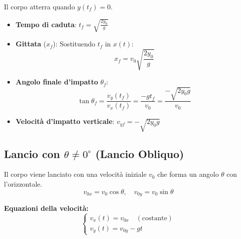 Il corpo atterra quando $y(t_f) = 0$.
\begin{itemize}
    \item \textbf{Tempo di caduta}: $t_f = \sqrt{\frac{2y_0}{g}}$
    \item \textbf{Gittata} ($x_f$): Sostituendo $t_f$ in $x(t)$:
    \begin{equation}
    x_f = v_0 \sqrt{\frac{2y_0}{g}}
\end{equation}
    \item \textbf{Angolo finale d'impatto} $\theta_f$:
    \begin{equation}
    \tan \theta_f = \frac{v_y(t_f)}{v_x(t_f)} = \frac{-g t_f}{v_0} = \frac{-\sqrt{2y_0 g}}{v_0}
\end{equation}
    \item \textbf{Velocità d'impatto verticale}: $v_{yf} = - \sqrt{2y_0 g}$
\end{itemize}

\begin{center}
\end{center}

\subsection{Lancio con \texorpdfstring{$\theta \neq 0^\circ$}{theta != 0} (Lancio Obliquo)}
Il corpo viene lanciato con una velocità iniziale $v_0$ che forma un angolo $\theta$ con l'orizzontale.
\begin{equation}
    v_{0x} = v_0 \cos\theta, \quad v_{0y} = v_0 \sin\theta
\end{equation}

\textbf{Equazioni della velocità:}
\begin{equation}
    \begin{cases}
    v_x(t) = v_{0x} \quad (\text{costante}) \\
    v_y(t) = v_{0y} - gt
\end{cases}
\end{equation}

